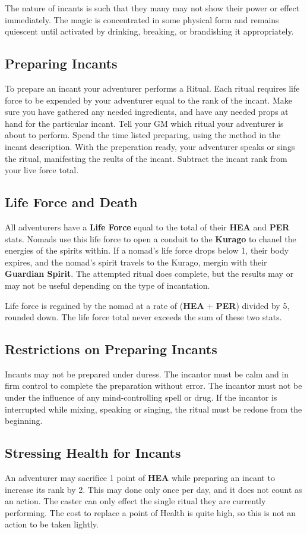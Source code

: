 \begin{multicols*}{2}
The nature of incants is such that they many may not show their power or effect immediately. The magic is concentrated in some physical form and remains quiescent until activated by drinking, breaking, or brandishing it appropriately.
\subsection{Preparing Incants}
To prepare an incant your adventurer performs a Ritual. Each ritual requires life force to be expended by your adventurer equal to the rank of the incant. Make sure you have gathered any needed ingredients, and have any needed props at hand for the particular incant. Tell your GM which ritual your adventurer is about to perform. Spend the time listed preparing, using the method in the incant description. With the preperation ready, your adventurer speaks or sings the ritual, manifesting the reults of the incant. Subtract the incant rank from your live force total.
\subsection{Life Force and Death}
All adventurers have a \textbf{Life Force} equal to the total of their \textbf{HEA} and \textbf{PER} stats. Nomads use this life force to open a conduit to the \textbf{Kurago} to chanel the energies of the spirits within. If a nomad’s life force drops below 1, their body expires, and the nomad’s spirit travels to the Kurago, mergin with their \textbf{Guardian Spirit}. The attempted ritual does complete, but the results may or may not be useful depending on the type of incantation.

Life force is regained by the nomad at a rate of (\textbf{HEA} + \textbf{PER}) divided by 5, rounded down. The life force total never exceeds the sum of these two stats.
\subsection{Restrictions on Preparing Incants}
Incants may not be prepared under duress. The incantor must be calm and in firm control to complete the preparation without error. The incantor must not be under the influence of any mind-controlling spell or drug. If the incantor is interrupted while mixing, speaking or singing, the ritual must be redone from the beginning.
\subsection{Stressing Health for Incants}
An adventurer may sacrifice 1 point of \textbf{HEA} while preparing an incant to increase its rank by 2. This may done only once per day, and it does not count as an action. The caster can only effect the single ritual they are currently performing. The cost to replace a point of Health is quite high, so this is not an action to be taken lightly.

\end{multicols*}
